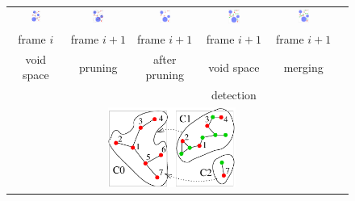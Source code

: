 \documentclass[usletter, 10pt, conference]{svjour3}      %
\begin{document}
\begin{figure}
\centering
{
\renewcommand{\tabcolsep}{1pt}
\begin{tabular}{cccccc}
\includegraphics[width=0.19\textwidth]{fig/rrtdyn2} &
\includegraphics[width=0.19\textwidth]{fig/rrtdyn3} &
\includegraphics[width=0.19\textwidth]{fig/rrtdyn4} & 
\includegraphics[width=0.19\textwidth]{fig/rrtdyn6} &
\includegraphics[width=0.19\textwidth]{fig/rrtdyn7} \\
 frame $i$ & frame $i+1$ & frame $i+1$ & frame $i+1$ & frame $i+1$ \\
void space & pruning & after pruning & void space  & merging \\
           &          &                & detection\\
\multicolumn{5}{c}{\includegraphics[width=0.4\textwidth]{fig/rrtdyn8}} \\

\end{tabular}}
\end{figure}
\end{document}
